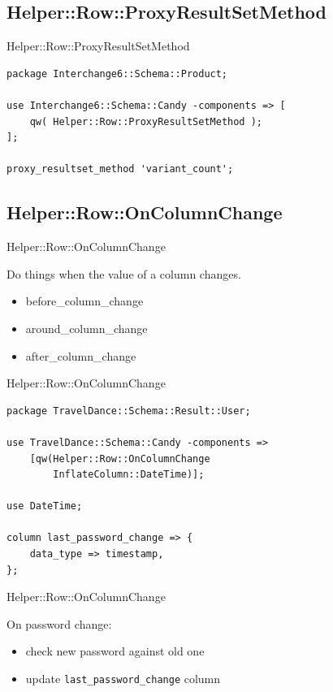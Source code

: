 \subsection{Helper::Row::ProxyResultSetMethod}

\begin{frame}[fragile]{Helper::Row::ProxyResultSetMethod}
\begin{lstlisting}
package Interchange6::Schema::Product;

use Interchange6::Schema::Candy -components => [
    qw( Helper::Row::ProxyResultSetMethod );
];

proxy_resultset_method 'variant_count';
\end{lstlisting}
\end{frame}

\subsection{Helper::Row::OnColumnChange}

\begin{frame}[fragile]{Helper::Row::OnColumnChange}

Do things when the value of a column changes.

\begin{itemize}
\item before\_column\_change
\item around\_column\_change
\item after\_column\_change
\end{itemize}

\end{frame}

\begin{frame}[fragile]{Helper::Row::OnColumnChange}

\begin{lstlisting}
package TravelDance::Schema::Result::User;

use TravelDance::Schema::Candy -components =>
    [qw(Helper::Row::OnColumnChange 
        InflateColumn::DateTime)];

use DateTime;

column last_password_change => {
    data_type => timestamp,
};
\end{lstlisting}
\end{frame}

\begin{frame}[fragile]{Helper::Row::OnColumnChange}

On password change:

\begin{itemize}
\item check new password against old one
\item update \verb|last_password_change| column
\end{itemize}

\end{frame}

